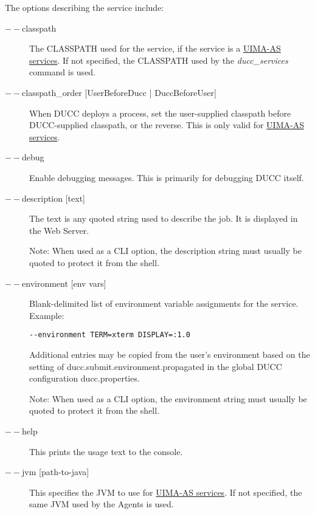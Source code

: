        The options describing the service include:
    \begin{description}

        \item[$--$classpath] The CLASSPATH used for the service, if the service is a
          \hyperref[sec:services.types]{UIMA-AS services}.  If not specified, the CLASSPATH used
          by the {\em ducc\_services} command is used.
          
        \item[$--$classpath\_order {[UserBeforeDucc | DuccBeforeUser]} ] When DUCC deploys a process,
          set the user-supplied classpath before DUCC-supplied classpath, or the reverse.  This is
          only valid for  \hyperref[sec:services.types]{UIMA-AS services}.
          
        \item[$--$debug ]
          Enable debugging messages. This is primarily for debugging DUCC itself. 
          
        \item[$--$description {[text]}] The text is any quoted string used to describe the job. It is
          displayed in the Web Server.

          Note: When used as a CLI option, the description string must usually be quoted to protect
          it from the shell.
    
        \item[$--$environment {[env vars]}] Blank-delimited list of environment variable
          assignments for the service. Example:
          \begin{verbatim}
--environment TERM=xterm DISPLAY=:1.0
          \end{verbatim}
             
          Additional entries may be copied from the user's environment based on the setting of
          ducc.submit.environment.propagated in the global DUCC configuration ducc.properties.

          Note: When used as a CLI option, the environment string must usually be
          quoted to protect it from the shell.
          
        \item[$--$help ] This prints the usage text to the console.

        \item[$--$jvm {[path-to-java]}] This specifies the JVM to use for 
          \hyperref[sec:services.types]{UIMA-AS services}. If not
          specified, the same JVM used by the Agents is used.  


\end{description}
